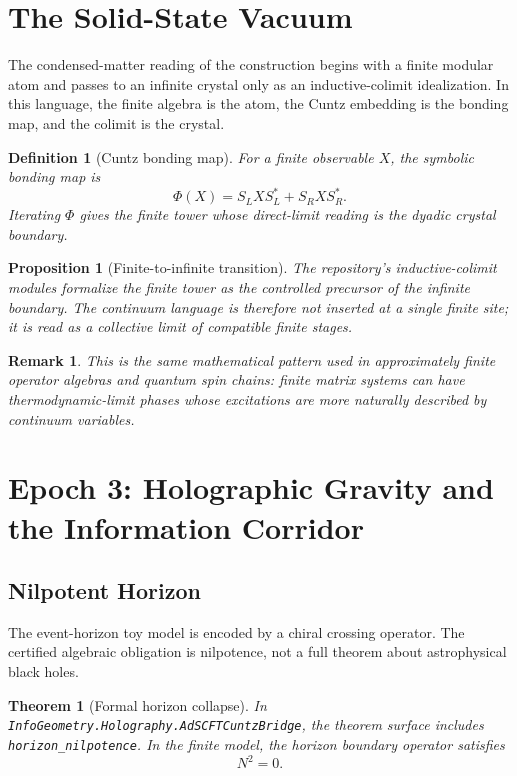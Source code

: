 \documentclass[11pt,a4paper]{article}
\newtheorem{theorem}{Theorem}
\newtheorem{proposition}{Proposition}
\newtheorem{definition}{Definition}
\newtheorem{remark}{Remark}
\begin{document}
\section{The Solid-State Vacuum}

The condensed-matter reading of the construction begins with a finite modular atom and passes to an infinite crystal only as an inductive-colimit idealization. In this language, the finite algebra is the atom, the Cuntz embedding is the bonding map, and the colimit is the crystal.

\begin{definition}[Cuntz bonding map]
For a finite observable $X$, the symbolic bonding map is
\[
  \Phi(X) = S_L X S_L^* + S_R X S_R^*.
\]
Iterating $\Phi$ gives the finite tower whose direct-limit reading is the dyadic crystal boundary.
\end{definition}

\begin{proposition}[Finite-to-infinite transition]
The repository's inductive-colimit modules formalize the finite tower as the controlled precursor of the infinite boundary. The continuum language is therefore not inserted at a single finite site; it is read as a collective limit of compatible finite stages.
\end{proposition}

\begin{remark}
This is the same mathematical pattern used in approximately finite operator algebras and quantum spin chains: finite matrix systems can have thermodynamic-limit phases whose excitations are more naturally described by continuum variables.
\end{remark}

\section{Epoch 3: Holographic Gravity and the Information Corridor}

\subsection{Nilpotent Horizon}

The event-horizon toy model is encoded by a chiral crossing operator. The certified algebraic obligation is nilpotence, not a full theorem about astrophysical black holes.

\begin{theorem}[Formal horizon collapse]
In \texttt{InfoGeometry.Holography.AdSCFTCuntzBridge}, the theorem surface includes \texttt{horizon\_nilpotence}. In the finite model, the horizon boundary operator satisfies
\[
  N^2 = 0.
\]
\end{theorem}
\end{document}
